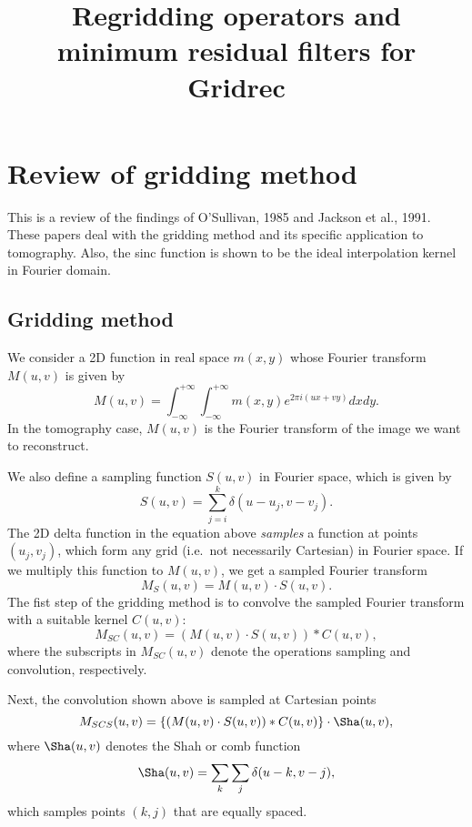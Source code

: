 \documentclass[11pt]{article}
\title{Regridding operators and minimum residual filters for Gridrec}
\begin{document}
\maketitle
\tableofcontents
\section{Review of gridding method}

This is a review of the findings of O'Sullivan, 1985 and Jackson et al., 1991. These papers deal with the gridding method and its specific application to tomography. Also, the sinc function is shown to be the ideal interpolation kernel in Fourier domain. 
\subsection{Gridding method}
We consider a 2D function in real space $m(x,y)$ whose Fourier transform $M(u,v)$ is given by
\begin{equation}
M(u,v) = \int_{-\infty}^{+\infty} \int_{-\infty}^{+\infty} m(x,y) e^{2\pi i (ux+vy)} dx dy.
\end{equation}
In the tomography case, $M(u,v)$ is the Fourier transform of the image we want to reconstruct.

We also define a sampling function $S(u,v)$ in Fourier space, which is given by
\begin{equation}
S(u,v) = \sum_{j=i}^{k} \delta(u-u_j, v-v_j).
\end{equation}
The 2D delta function in the equation above \emph{samples} a function at points $(u_j, v_j)$, which form any grid (i.e.~not necessarily Cartesian) in Fourier space. If we multiply this function to $M(u,v)$, we get a sampled Fourier transform
\begin{equation}
M_S(u,v) = M(u,v) \cdot S(u,v).
\end{equation}
The fist step of the gridding method is to convolve the sampled Fourier transform with a suitable kernel $C(u,v)$:
\begin{equation}
M_{SC}(u,v) = (M(u,v) \cdot S(u,v)) \ast C(u,v),
\end{equation}
where the subscripts in $M_{SC}(u,v)$ denote the operations sampling and convolution, respectively. 

Next, the convolution shown above is sampled at Cartesian points
\begin{equation}
M_{SCS}(u,v) = \{(M(u,v) \cdot S(u,v)) \ast C(u,v)\} \cdot \Sha(u,v),
\end{equation}
where $\Sha(u,v)$ denotes the Shah or comb function
\begin{equation}
\Sha(u,v) = \sum_{k} \sum_{j} \delta(u-k,v-j),
\end{equation}
which samples points $(k,j)$ that are equally spaced.
\end{document}
